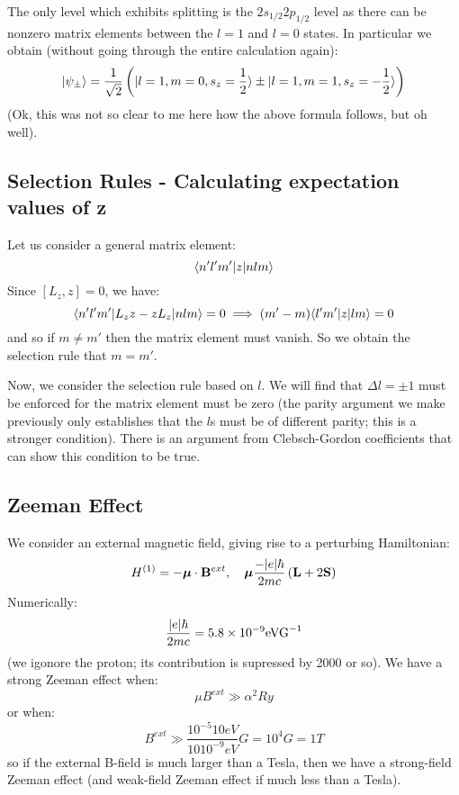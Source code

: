 The only level which exhibits splitting is the $2s_{1/2}2p_{1/2}$ level as there can be nonzero matrix elements between the $l = 1$ and $l = 0$ states. In particular we obtain (without going through the entire calculation again):
\begin{equation}
    \ket{\psi_\pm} = \frac{1}{\sqrt{2}}\left(\ket{l=1, m=0, s_z = \frac{1}{2}} \pm \ket{l=1, m=1, s_z = -\frac{1}{2}}\right)
\end{equation}
(Ok, this was not so clear to me here how the above formula follows, but oh well).


\subsection{Selection Rules - Calculating expectation values of z}
Let us consider a general matrix element:
\begin{equation}
    \bra{n'l'm'}z\ket{nlm}
\end{equation}
Since $[L_z, z] = 0$, we have:
\begin{equation}
    \bra{n'l'm'}L_z z - zL_z\ket{nlm} = 0 \implies (m' - m)\bra{l'm'}z\ket{lm} = 0
\end{equation}
and so if $m \neq m'$ then the matrix element must vanish. So we obtain the selection rule that $m = m'$. 

Now, we consider the selection rule based on $l$. We will find that $\Delta l = \pm 1$ must be enforced for the matrix element must be zero (the parity argument we make previously only establishes that the $l$s must be of different parity; this is a stronger condition). There is an argument from Clebsch-Gordon coefficients that can show this condition to be true.

\subsection{Zeeman Effect}
We consider an external magnetic field, giving rise to a perturbing Hamiltonian:
\begin{equation}
    H^{(1)} = -\gv{\mu} \cdot \v{B}^{ext}, \quad \gv{\mu}\frac{-\abs{e}\hbar}{2mc}\left(\v{L} + 2\v{S}\right)
\end{equation}
Numerically:
\begin{equation}
    \frac{\abs{e}\hbar}{2mc} = 5.8 \times 10^{-9}\si{eVG^{-1}}
\end{equation}
(we igonore the proton; its contribution is supressed by 2000 or so). We have a strong Zeeman effect when:
\begin{equation}
    \mu B^{ext} \gg \alpha^2 \si{Ry}
\end{equation}
or when:
\begin{equation}
    B^{ext} \gg \frac{10^{-5}10\si{eV}}{10 10^{-9} \si{eV}} G = 10^4 \si{G} = 1\si{T}
\end{equation}
so if the external B-field is much larger than a Tesla, then we have a strong-field Zeeman effect (and weak-field Zeeman effect if much less than a Tesla). 

